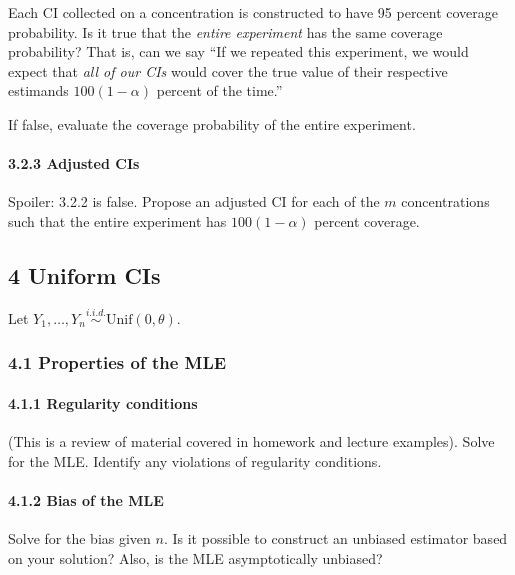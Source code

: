 \documentclass[
]{article}
\begin{document}
Each CI collected on a concentration is constructed to have 95 percent
coverage probability. Is it true that the \emph{entire experiment} has
the same coverage probability? That is, can we say ``If we repeated this
experiment, we would expect that \emph{all of our CIs} would cover the
true value of their respective estimands \(100(1 - \alpha)\) percent of
the time.''

If false, evaluate the coverage probability of the entire experiment.

\hypertarget{adjusted-cis}{%
\paragraph{3.2.3 Adjusted CIs}\label{adjusted-cis}}

Spoiler: 3.2.2 is false. Propose an adjusted CI for each of the \(m\)
concentrations such that the entire experiment has \(100(1 - \alpha)\)
percent coverage.

\hypertarget{uniform-cis}{%
\subsection{4 Uniform CIs}\label{uniform-cis}}

Let \(Y_1, \dots, Y_n \overset{i.i.d.}{\sim} \textrm{Unif}(0, \theta)\).

\hypertarget{properties-of-the-mle}{%
\subsubsection{4.1 Properties of the MLE}\label{properties-of-the-mle}}

\hypertarget{regularity-conditions}{%
\paragraph{4.1.1 Regularity conditions}\label{regularity-conditions}}

(This is a review of material covered in homework and lecture examples).
Solve for the MLE. Identify any violations of regularity conditions.

\hypertarget{bias-of-the-mle}{%
\paragraph{4.1.2 Bias of the MLE}\label{bias-of-the-mle}}

Solve for the bias given \(n\). Is it possible to construct an unbiased
estimator based on your solution? Also, is the MLE asymptotically
unbiased?
\end{document}
